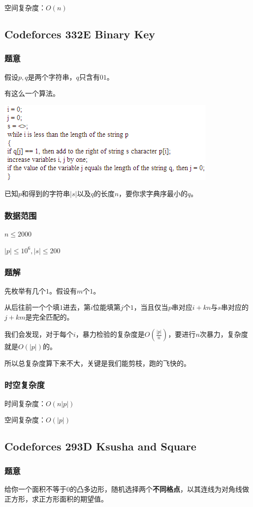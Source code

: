 \documentclass{ctexart}
\begin{document}
空间复杂度：$O(n)$
\subsection{Codeforces 332E Binary Key}
\subsubsection{题意}
假设$p,q$是两个字符串，$q$只含有$01$。

有这么一个算法。

\includegraphics{code.png}

已知$p$和得到的字符串$|s|$以及$q$的长度$n$，要你求字典序最小的$q$。
\subsubsection{数据范围}
$n \le 2000$

$|p| \le 10^6,|s| \le 200$
\subsubsection{题解}
先枚举有几个$1$。假设有$m$个$1$。

从后往前一个个填$1$进去，第$i$位能填第$j$个$1$，当且仅当$p$串对应$i+kn$与$s$串对应的$j+km$是完全匹配的。

我们会发现，对于每个$i$，暴力检验的复杂度是$O(\frac{|p|}{n})$，要进行$n$次暴力，复杂度就是$O(|p|)$的。

所以总复杂度算下来不大，关键是我们能剪枝，跑的飞快的。
\subsubsection{时空复杂度}
时间复杂度：$O(n|p|)$

空间复杂度：$O(|p|)$
\subsection{Codeforces 293D Ksusha and Square}
\subsubsection{题意}
给你一个面积不等于$0$的凸多边形，随机选择两个\textbf{不同格点}，以其连线为对角线做正方形，求正方形面积的期望值。
\end{document}
